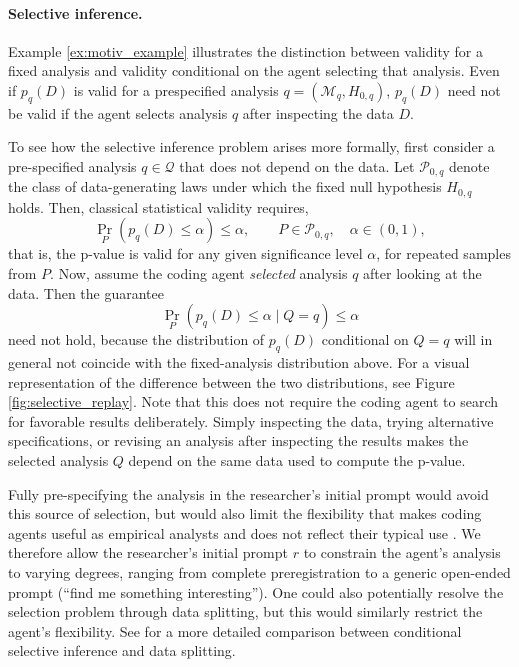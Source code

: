 \documentclass[10pt]{article}
\begin{document}
\paragraph{Selective inference.}
Example \ref{ex:motiv_example} illustrates the distinction between validity for a fixed analysis and validity conditional on the agent selecting that analysis. Even if $p_q(D)$ is valid for a prespecified analysis $q=(\mathcal M_q,H_{0,q})$, $p_q(D)$ need not be valid if the agent selects analysis $q$ after inspecting the data $D$.

To see how the selective inference problem arises more formally, first consider a pre-specified analysis $q \in \mathcal{Q}$ that does not depend on the data. Let $\mathcal{P}_{0,q}$ denote the class of data-generating laws under which the fixed null hypothesis $H_{0,q}$ holds. Then, classical statistical validity requires,
\begin{equation} \label{eq:p_value_fixed}
\Pr_P\!\left(p_q(D)\leq\alpha\right)\leq\alpha,
\qquad
P\in\mathcal P_{0,q},\quad \alpha\in(0,1),
\end{equation}
that is, the p-value is valid for any given significance level $\alpha$, for repeated samples from $P$. Now, assume the coding agent \textit{selected} analysis $q$ after looking at the data. Then the guarantee
\[
\Pr_P\!\left(p_q(D)\leq\alpha\mid Q=q\right)
\leq\alpha
\]
need not hold, because the distribution of $p_q(D)$ conditional on $Q=q$ will in general not coincide with the fixed-analysis distribution above. For a visual representation of the difference between the two distributions, see Figure \ref{fig:selective_replay}. Note that this does not require the coding agent to search for favorable results deliberately. Simply inspecting the data, trying alternative specifications, or revising an analysis after inspecting the results makes the selected analysis $Q$ depend on the same data used to compute the p-value.

Fully pre-specifying the analysis in the researcher's initial prompt would avoid this source of selection, but would also limit the flexibility that makes coding agents useful as empirical analysts and does not reflect their typical use \citep[see e.g.][]{hitzig2026agentic, codreanu2026ai}. We therefore allow the researcher's initial prompt $r$ to constrain the agent's analysis to varying degrees, ranging from complete preregistration to a generic open-ended prompt (``find me something interesting''). One could also potentially resolve the selection problem through data splitting, but this would similarly restrict the agent's flexibility. See \citet{fithian2014optimal} for a more detailed comparison between conditional selective inference and data splitting.
\end{document}
